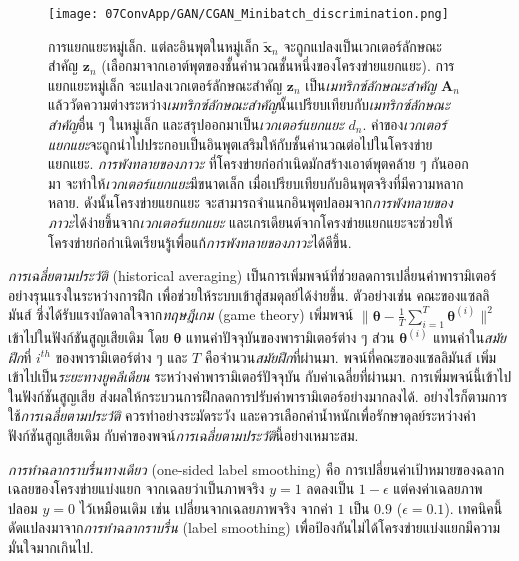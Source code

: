%
\begin{figure}
	\begin{center}
		\texttt{[image: 07ConvApp/GAN/CGAN\_Minibatch\_discrimination.png]}
		\caption[การแยกแยะหมู่เล็ก]{การแยกแยะหมู่เล็ก. แต่ละอินพุตในหมู่เล็ก $\tilde{\bm{x}}_n$ จะถูกแปลงเป็นเวกเตอร์ลักษณะสำคัญ $\bm{z}_n$ (เลือกมาจากเอาต์พุตของชั้นคำนวณชั้นหนึ่งของโครงข่ายแยกแยะ). 
		การแยกแยะหมู่เล็ก จะแปลงเวกเตอร์ลักษณะสำคัญ $\bm{z}_n$ เป็น\textit{เมทริกซ์ลักษณะสำคัญ} $\bm{A}_n$
		แล้ววัดความต่างระหว่าง\textit{เมทริกซ์ลักษณะสำคัญ}นั้นเปรียบเทียบกับ\textit{เมทริกซ์ลักษณะสำคัญ}อื่น ๆ ในหมู่เล็ก 
		และสรุปออกมาเป็น\textit{เวกเตอร์แยกแยะ} $d_n$.
		ค่าของ\textit{เวกเตอร์แยกแยะ}จะถูกนำไปประกอบเป็นอินพุตเสริมให้กับชั้นคำนวณต่อไปในโครงข่ายแยกแยะ.
		\textit{การพังทลายของภาวะ} ที่โครงข่ายก่อกำเนิดมักสร้างเอาต์พุตคล้าย ๆ กันออกมา จะทำให้\textit{เวกเตอร์แยกแยะ}มีขนาดเล็ก เมื่อเปรียบเทียบกับอินพุตจริงที่มีความหลากหลาย.
		ดังนั้นโครงข่ายแยกแยะ จะสามารถจำแนกอินพุตปลอมจาก\textit{การพังทลายของภาวะ}ได้ง่ายขึ้นจาก\textit{เวกเตอร์แยกแยะ} 
		และเกรเดียนต์จากโครงข่ายแยกแยะจะช่วยให้โครงข่ายก่อกำเนิดเรียนรู้เพื่อแก้\textit{การพังทลายของภาวะ}ได้ดีขึ้น.
	}
		\label{fig: conv app minibatch discrimination}
	\end{center}
\end{figure}
%

\textit{การเฉลี่ยตามประวัติ} (historical averaging)
เป็นการเพิ่มพจน์ที่ช่วยลดการเปลี่ยนค่าพารามิเตอร์อย่างรุนแรงในระหว่างการฝึก 
เพื่อช่วยให้ระบบเข้าสู่สมดุลย์ได้ง่ายขึ้น.
ตัวอย่างเช่น คณะของแซลลิมันส์\cite{SalimansEtAl2016} 
ซึ่งได้รับแรงบัลดาลใจจาก\textit{ทฤษฎีเกม} (game theory) 
เพิ่มพจน์ $\| \bm{\theta} - \frac{1}{T} \sum_{i=1}^T \bm{\theta}^{(i)} \|^2$ เข้าไปในฟังก์ชันสูญเสียเดิม 
โดย $\bm{\theta}$ แทนค่าปัจจุบันของพารามิเตอร์ต่าง ๆ
ส่วน $\bm{\theta}^{(i)}$ แทนค่าใน\textit{สมัยฝึก}ที่ $i^{th}$ ของพารามิเตอร์ต่าง ๆ
และ $T$ คือจำนวน\textit{สมัยฝึก}ที่ผ่านมา.
พจน์ที่คณะของแซลลิมันส์ เพิ่มเข้าไปเป็น\textit{ระยะทางยูคลีเดียน} ระหว่างค่าพารามิเตอร์ปัจจุบัน กับค่าเฉลี่ยที่ผ่านมา.
การเพิ่มพจน์นี้เข้าไปในฟังก์ชันสูญเสีย ส่งผลให้กระบวนการฝึกลดการปรับค่าพารามิเตอร์อย่างมากลงได้.
อย่างไรก็ตามการใช้\textit{การเฉลี่ยตามประวัติ} ควรทำอย่างระมัดระวัง และควรเลือกค่าน้ำหนักเพื่อรักษาดุลย์ระหว่างค่าฟังก์ชันสูญเสียเดิม กับค่าของพจน์\textit{การเฉลี่ยตามประวัติ}นี้อย่างเหมาะสม.


\textit{การทำฉลากราบรื่นทางเดียว} (one-sided label smoothing)
คือ การเปลี่ยนค่าเป้าหมายของฉลากเฉลยของโครงข่ายแบ่งแยก จากเฉลยว่าเป็นภาพจริง $y = 1$ ลดลงเป็น $1 - \epsilon$
แต่คงค่าเฉลยภาพปลอม $y = 0$ ไว้เหมือนเดิม
เช่น เปลี่ยนจากเฉลยภาพจริง จากค่า $1$ เป็น $0.9$ ($\epsilon = 0.1$).
เทคนิคนี้ดัดแปลงมาจาก\textit{การทำฉลากราบรื่น} (label smoothing) เพื่อป้องกันไม่ได้โครงข่ายแบ่งแยกมีความมั่นใจมากเกินไป.

